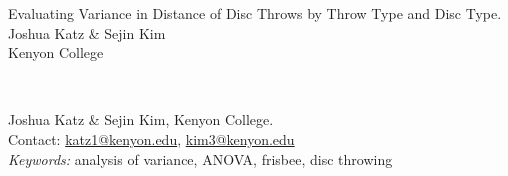 \documentclass[letter,12pt]{article}
\begin{document}
	\thispagestyle{plain}
	\begin{center}
		\vspace*{150pt}
		Evaluating Variance in Distance of Disc Throws by Throw Type and Disc Type. \\
		Joshua Katz \& Sejin Kim \\
		Kenyon College \\
	\end{center}
	\vspace*{120pt}
	 \\
	\begin{raggedright}
		Joshua Katz \& Sejin Kim, Kenyon College. \\
		Contact: \href{mailto:katz1@kenyon.edu}{katz1@kenyon.edu}, \href{mailto:kim3@kenyon.edu}{kim3@kenyon.edu} \\
		\vspace*{40pt}
		\textit{Keywords:} analysis of variance, ANOVA, frisbee, disc throwing
	\end{raggedright}
	
	\newpage
\end{document}

